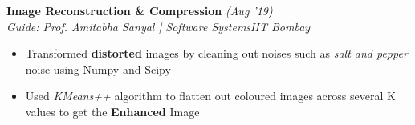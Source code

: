 \documentclass{article}
\newcommand{\xfilll}[2][1ex]{
\dimen0=#2\advance\dimen0 by #1
\leaders\hrule height \dimen0 depth -#1\hfill}
\begin{document}
\hspace*{-16pt}\textbf{Image Reconstruction \& Compression} \hfill{\sl \small (Aug '19)}\\
{\it Guide: Prof. Amitabha Sanyal | Software Systems}\hfill{\sl \small IIT Bombay}\\
\vspace{-17pt}
\begin{itemize}[itemsep = -0.75 mm, leftmargin=*]
  \item Transformed {\bf distorted} images by cleaning out noises such as {\it salt and pepper} noise using Numpy and Scipy
  \item Used {\it KMeans++} algorithm to flatten out coloured images across several K values to get the {\bf Enhanced} Image  
\end{itemize}
\vspace{-13pt}
\end{document}
